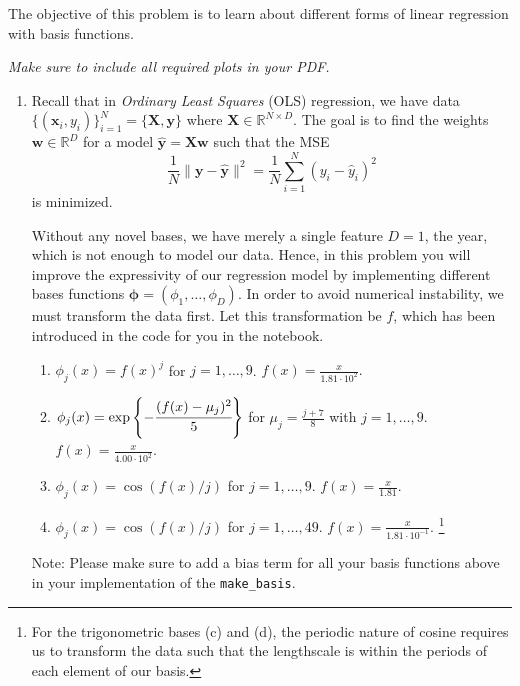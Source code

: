 \documentclass[submit]{harvardml}
\begin{document}
\newpage
\begin{problem}

 The objective of this problem is to learn about different forms of
 linear regression with basis functions.

\vspace{1em}
\noindent\emph{Make sure to include all required plots in your PDF.}

\begin{enumerate}
\item 
Recall that in \emph{Ordinary Least Squares} (OLS) regression,
we have data $\{(\mathbf{x}_i, y_i)\}_{i=1}^N = \{\mathbf{X}, \mathbf{y}\}$ 
where $\mathbf{X} \in \mathbb{R}^{N\times D}$. The goal is to find 
the weights $\mathbf{w} \in \mathbb{R}^{D}$ for a model 
$\hat{\mathbf{y}} = \mathbf{X}\mathbf{w}$ such that the MSE 
\[ \frac{1}{N} \| \mathbf{y} - \hat{\mathbf{y}}\|^2 = \frac{1}{N} \sum_{i = 1} ^N (y_i - \hat{y}_i)^2\] 
is minimized. 

Without any novel bases, we have merely a single feature $D=1$, 
the year, which is not enough to model our data. Hence, in this 
problem you will improve the expressivity of our regression 
model by implementing different bases functions 
$\mathbf{\phi} = (\phi_1,\ldots,\phi_D)$. In order to avoid numerical instability, 
we must transform the data first. Let
this transformation be $f$, which has been introduced in
the code for you in the notebook.
\begin{enumerate}
  \item $\phi_j(x)= f(x)^j$ for $j=1,\ldots, 9$. $f(x) = \frac{x}{1.81 \cdot 10^{2}}.$
  \item $\phi_j(x) = \exp\left\{-\cfrac{(f(x)-\mu_j)^2}{5}\right\}$ for $\mu_j=\frac{j + 7}{8}$ with $j=1,\ldots, 9$. $f(x) = \frac{x}{4.00 \cdot 10^{2}}.$
  \item $\phi_j(x) =  \cos(f(x) / j)$ for $j=1, \ldots, 9$. $f(x) = \frac{x}{1.81}$.
  \item $\phi_j(x) = \cos(f(x) / j)$ for $j=1, \ldots, 49$. $f(x) = \frac{x}{1.81 \cdot 10^{-1}}$. \footnote{For the trigonometric bases (c) and (d), the periodic nature of
cosine requires us to transform the data such that the 
lengthscale is within the periods of each element of our basis.}

\end{enumerate}

{\footnotesize * Note: Please make sure to add a bias term for
all your basis functions above in your implementation of the 
\verb|make_basis|.}


\end{enumerate}
\end{problem}
\end{document}
